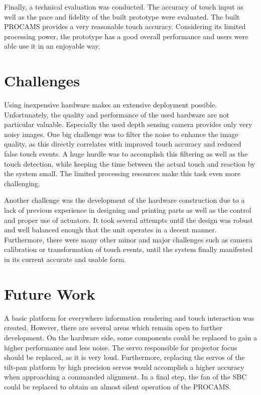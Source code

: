 Finally, a technical evaluation was conducted. The accuracy of touch input as well as the pace and fidelity of the built prototype were evaluated. The built PROCAMS provides a very reasonable touch accuracy. Considering its limited processing power, the prototype has a good overall performance and users were able use it in an enjoyable way.

\section{Challenges}
Using inexpensive hardware makes an extensive deployment possible. Unfortunately, the quality and performance of the used hardware are not particular valuable. Especially the used depth sensing camera provides only very noisy images. One big challenge was to filter the noise to enhance the image quality, as this directly correlates with improved touch accuracy and reduced false touch events. A huge hurdle was to accomplish this filtering as well as the touch detection, while keeping the time between the actual touch and reaction by the system small. The limited processing resources make this task even more challenging.

Another challenge was the development of the hardware construction due to a lack of previous experience in designing and printing parts as well as the control and proper use of actuators. It took several attempts until the design was robust and well balanced enough that the unit operates in a decent manner.
Furthermore, there were many other minor and major challenges such as camera calibration or transformation of touch events, until the system finally manifested in its current accurate and usable form. 

\section{Future Work}

A basic platform for everywhere information rendering and touch interaction was created. However, there are several areas which remain open to further development. On the hardware side, some components could be replaced to gain a higher performance and less noise. The servo responsible for projector focus should be replaced, as it is very loud. Furthermore, replacing the servos of the tilt-pan platform by high precision servos would accomplish a higher accuracy when approaching a commanded alignment. In a final step, the fan of the \ac{SBC} could be replaced to obtain an almost silent operation of the PROCAMS. 

